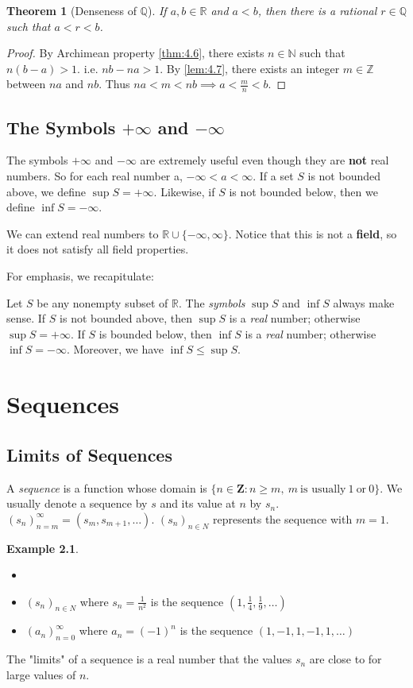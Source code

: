 \documentclass[12pt, lettersize]{book}
\theoremstyle{plain}
\newtheorem{thm}{Theorem}[section]
\theoremstyle{definition}
\newtheorem*{eg}{Example}
\theoremstyle{remark}
\newcommand{\R}{\mathbb{R}}
\newcommand{\N}{\mathbb{N}}
\newcommand{\Q}{\mathbb{Q}}
\newcommand{\Z}{\mathbb{Z}}
\begin{document}
		\begin{thm}[Denseness of $\Q$]\label{thm:4.7}
		If $a,b\in\R$ and $a<b$, then there is a rational $r\in\Q$ such that $a<r<b$.
		\end{thm}
		\begin{proof}
		By Archimean property \ref{thm:4.6}, there exists $n\in\N$ such that $n(b-a)>1$. i.e. $nb-na>1$. By \ref{lem:4.7}, there exists an integer $m\in\Z$ between $na$ and $nb$. Thus $na<m<nb\implies a<\frac{m}{n}<b$.
		\end{proof}
		\newpage
	\section{The Symbols $+\infty$ and $-\infty$}
		The symbols $+\infty$ and $-\infty$ are extremely useful even though they are \textbf{not} real numbers. So for each real number a, $-\infty<a<\infty$. If a set $S$ is not bounded above, we define $\sup S=+\infty$. Likewise, if $S$ is not bounded below, then we define $\inf S=-\infty$.
		
		We can extend real numbers to $\R\cup\{-\infty,\infty\}$. Notice that this is not a \textbf{field}, so it does not satisfy all field properties.
		
		For emphasis, we recapitulate:
		
		Let $S$ be any nonempty subset of $\R$. The \emph{symbols} $\sup S$ and $\inf S$ always make sense. If $S$ is not bounded above, then $\sup S$ is a \emph{real} number; otherwise $\sup S=+\infty$. If $S$ is bounded below, then $\inf S$ is a \emph{real} number; otherwise $\inf S=-\infty$. Moreover, we have $\inf S\leq\sup S$.
		
	\chapter{Sequences}
	\newpage
	\section{Limits of Sequences}
		A \emph{sequence} is a function whose domain is $\{n \in \mathbf{Z}: n \geq m,\ m\ \text{is usually}\ 1\ \text{or}\ 0\}$.
		We usually denote a sequence by $s$ and its value at $n$ by $s_n$. $(s_n)^\infty_{n=m}=(s_m,s_{m+1},\dots)$. $(s_n)_{n\in N}$ represents the sequence with $m=1$.
		\begin{eg}
		\begin{itemize}
			\item[]
			\item $(s_n)_{n\in N}$ where $s_n=\frac{1}{n^2}$ is the sequence $(1,\frac{1}{4},\frac{1}{9},\dots)$
			\item $(a_n)^\infty_{n=0}$ where $a_n=(-1)^n$ is the sequence $(1,-1,1,-1,1,\dots)$ 
		\end{itemize}
		\end{eg}
		The "limits" of a sequence is a real number that the values $s_n$ are close to for large values of $n$.
		
\end{document}
